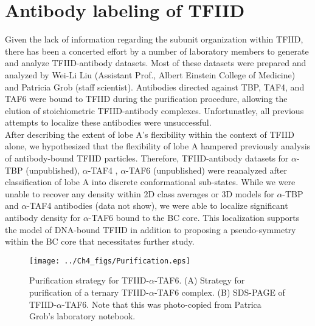
\chapter{Antibody labeling of TFIID}

Given the lack of information regarding the subunit organization within TFIID, there has been a concerted effort by a number of laboratory members to generate and analyze TFIID-antibody datasets. Most of these datasets were prepared and analyzed by Wei-Li Liu (Assistant Prof., Albert Einstein College of Medicine) and Patricia Grob (staff scientist). Antibodies directed against TBP, TAF4, and TAF6 were bound to TFIID during the purification procedure, allowing the elution of stoichiometric TFIID-antibody complexes. Unfortunatley, all previous attempts to localize these antibodies were unsuccessful. \\
\indent After describing the extent of lobe A's flexibility within the context of TFIID alone, we hypothesized that the flexibility of lobe A hampered previously analysis of antibody-bound TFIID particles. Therefore, TFIID-antibody datasets for $\alpha$-TBP (unpublished), $\alpha$-TAF4 \cite{Liu_723}, $\alpha$-TAF6 (unpublished) were reanalyzed after classification of lobe A into discrete conformational sub-states. While we were unable to recover any density within 2D class averages or 3D models for $\alpha$-TBP and $\alpha$-TAF4 antibodies (data not show), we were able to localize significant antibody density for $\alpha$-TAF6 bound to the BC core. This localization supports the model of DNA-bound TFIID in addition to proposing a pseudo-symmetry within the BC core that necessitates further study. 
\begin{figure}
\centering
\texttt{[image: ../Ch4\_figs/Purification.eps]}
\caption[Purification strategy for TFIID-$\alpha$-TAF6]{Purification strategy for TFIID-$\alpha$-TAF6. (A) Strategy for purification of a ternary TFIID-$\alpha$-TAF6 complex. (B) SDS-PAGE of TFIID-$\alpha$-TAF6. Note that this was photo-copied from Patrica Grob's laboratory notebook. }
\label{fig:Purify}
\end{figure}


